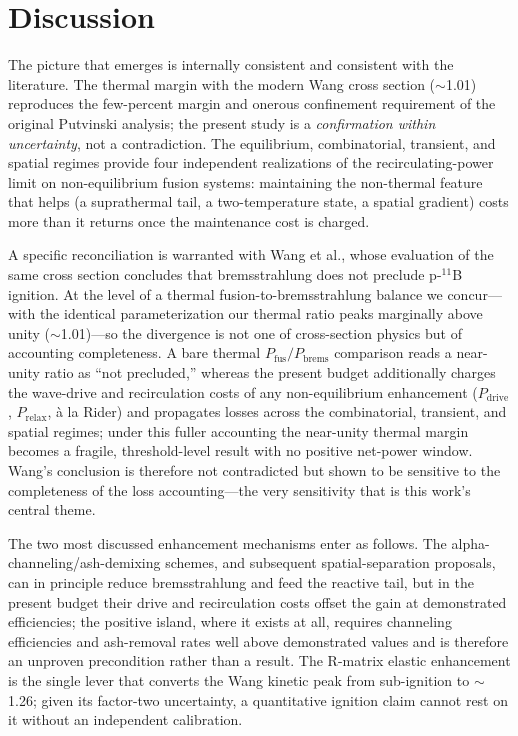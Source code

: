 \documentclass[aip,pop,reprint,amsmath,amssymb,floatfix]{revtex4-2}
\begin{document}
\section{Discussion}

The picture that emerges is internally consistent and consistent with the literature. The thermal margin with the modern Wang cross section ($\sim$1.01) reproduces the few-percent margin and onerous confinement requirement of the original Putvinski analysis\cite{put1}; the present study is a \textit{confirmation within uncertainty}, not a contradiction. The equilibrium, combinatorial, transient, and spatial regimes provide four independent realizations of the recirculating-power limit on non-equilibrium fusion systems\cite{rider}: maintaining the non-thermal feature that helps (a suprathermal tail, a two-temperature state, a spatial gradient) costs more than it returns once the maintenance cost is charged.

A specific reconciliation is warranted with Wang et al.\cite{wang}, whose evaluation of the same cross section concludes that bremsstrahlung does not preclude p-$^{11}$B ignition. At the level of a thermal fusion-to-bremsstrahlung balance we concur---with the identical parameterization our thermal ratio peaks marginally above unity ($\sim$1.01)---so the divergence is not one of cross-section physics but of accounting completeness. A bare thermal $P_\mathrm{fus}/P_\mathrm{brems}$ comparison reads a near-unity ratio as ``not precluded,'' whereas the present budget additionally charges the wave-drive and recirculation costs of any non-equilibrium enhancement ($P_\mathrm{drive}$, $P_\mathrm{relax}$, \`a la Rider) and propagates losses across the combinatorial, transient, and spatial regimes; under this fuller accounting the near-unity thermal margin becomes a fragile, threshold-level result with no positive net-power window. Wang's conclusion is therefore not contradicted but shown to be sensitive to the completeness of the loss accounting---the very sensitivity that is this work's central theme.

The two most discussed enhancement mechanisms enter as follows. The alpha-channeling/ash-demixing schemes\cite{ochs}, and subsequent spatial-separation proposals, can in principle reduce bremsstrahlung and feed the reactive tail, but in the present budget their drive and recirculation costs offset the gain at demonstrated efficiencies; the positive island, where it exists at all, requires channeling efficiencies and ash-removal rates well above demonstrated values and is therefore an unproven precondition rather than a result. The R-matrix elastic enhancement is the single lever that converts the Wang kinetic peak from sub-ignition to $\sim$1.26; given its factor-two uncertainty, a quantitative ignition claim cannot rest on it without an independent calibration.
\end{document}
